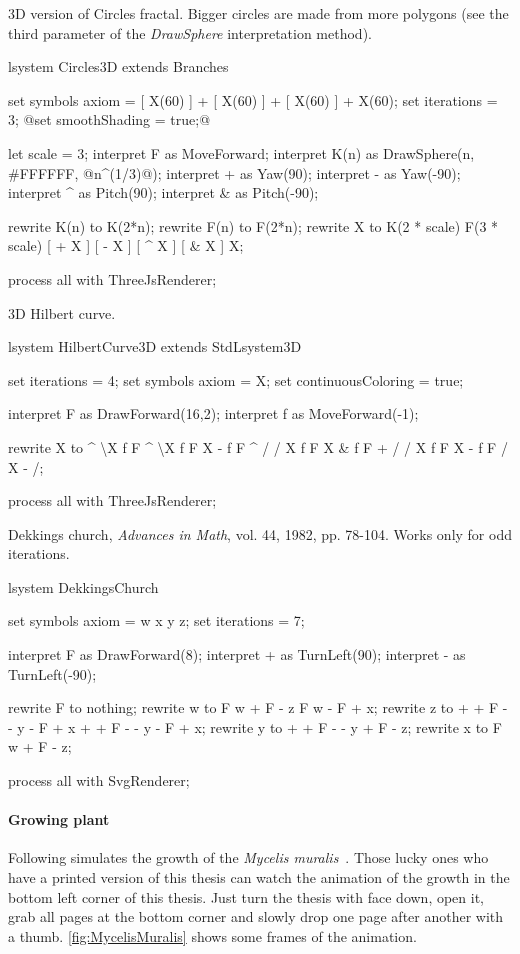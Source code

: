  3D version of Circles fractal.
Bigger circles are made from more polygons (see the third parameter of the \emph{DrawSphere} interpretation method).

\begin{LsystemBreak}
lsystem Circles3D extends Branches {
	set symbols axiom = [ X(60) ] + [ X(60) ] + [ X(60) ] + X(60);
	set iterations = 3;
	@set smoothShading = true;@

	let scale = 3;
	interpret F as MoveForward;
	interpret K(n) as DrawSphere(n, #FFFFFF, @n^(1/3)@);
	interpret + as Yaw(90);
	interpret - as Yaw(-90);
	interpret ^ as Pitch(90);
	interpret & as Pitch(-90);

	rewrite K(n) to K(2*n);
	rewrite F(n) to F(2*n);
	rewrite X to K(2 * scale) F(3 * scale) [ + X ] [ - X ] [ ^ X ] [ & X ] X;
}
process all with ThreeJsRenderer;
\end{LsystemBreak}


 3D Hilbert curve.

\begin{LsystemBreak}
lsystem HilbertCurve3D extends StdLsystem3D {
	set iterations = 4;
	set symbols axiom = X;
	set continuousColoring = true;

	interpret F as DrawForward(16,2);
	interpret f as MoveForward(-1);

	rewrite X to ^ \textbackslash X f F ^ \textbackslash X f F X - f F ^ / /
		X f F X & f F + / / X f F X - f F / X - /;
}

process all with ThreeJsRenderer;
\end{LsystemBreak}


 Dekkings church, \emph{Advances in Math}, vol. 44, 1982, pp. 78-104.
Works only for odd iterations.

\begin{LsystemBreak}
lsystem DekkingsChurch {
	set symbols axiom = w x y z;
	set iterations = 7;

	interpret F as DrawForward(8);
	interpret + as TurnLeft(90);
	interpret - as TurnLeft(-90);

	rewrite F to nothing;
	rewrite w to F w + F - z F w - F + x;
	rewrite z to + + F - - y - F + x + + F - - y - F + x;
	rewrite y to + + F - - y + F - z;
	rewrite x to F w + F - z;
}
process all with SvgRenderer;
\end{LsystemBreak}



\paragraph{Growing plant} Following \lsystem simulates the growth of the \emph{Mycelis muralis}~\cite[p.~89]{PL91}.
Those lucky ones who have a printed version of this thesis can watch the animation of the growth in the bottom left corner of this thesis.
Just turn the thesis with face down, open it, grab all pages at the bottom corner and slowly drop one page after another with a thumb.
\autoref{fig:MycelisMuralis} shows some frames of the animation.

